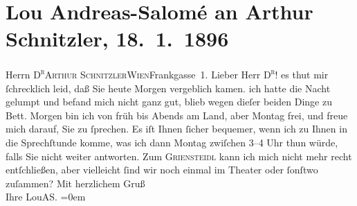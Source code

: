 

         
         \renewcommand{\erwaehntePersonen}{Personen: Lou Andreas-Salomé}
         \renewcommand{\erwaehnteOrte}{Orte: Café Griensteidl, Frankgasse 1, I., Innere Stadt, IX., Alsergrund, Wien}
         \renewcommand{\erwaehnteWerke}{}
               \section[Lou Andreas-Salomé an Arthur Schnitzler, 18. 1. 1896]{ Lou Andreas-Salomé an Arthur Schnitzler, 18. 1. 1896}\nopagebreak{}\rehead{ }\begin{ledgroupsized}[t]{13cm}\normalsize\beginnumbering \toendnotes[C]{\smallbreak\pagebreak[2]} 
\pstart{}{\pb}Herrn \textsc{D\textsuperscript{r}}\pend{}\pstart{}\textsc{Arthur Schnitzler}\pend{}\pstart{}\textsc{Wien}\pend{}\pstart{}Frankgasse 1. \pend{}{\bigskip}\pstart
           \noindent{}{\pb}Lieber Herr \textsc{D\textsuperscript{r}}! es thut mir ſchrecklich leid, daß Sie heute Morgen vergeblich
               kamen. ich hatte die Nacht gelumpt und befand mich nicht ganz gut, blieb wegen dieſer
               beiden Dinge zu Bett. Morgen bin ich von früh bis Abends am Land, aber Montag frei,
               und freue mich darauf, Sie zu ſprechen. Es iſt Ihnen ſicher bequemer, wenn ich zu
               Ihnen in die Sprechſtunde komme, was ich dann Montag zwiſchen 3–4 Uhr
               thun würde, falls Sie nicht weiter antworten. Zum \textsc{Griensteidl} kann ich mich nicht mehr recht entſchließen, aber vielleicht ſind wir noch
               einmal im Theater oder ſonſtwo zuſammen?\pend
           \pstart
           Mit herzlichem Gruß{\\[\baselineskip]}Ihre \spacefill\mbox{LouAS.}\pend
           \leftskip=0em{}
         
         \endnumbering{}\end{ledgroupsized}  \newcommand{\dateiname}{L00529}\newcommand{\titel}{Lou Andreas-Salomé an Arthur Schnitzler, 18. 1. 1896}\newcommand{\editorInnen}{Martin Anton Müller und Gerd-Hermann Susen}
      